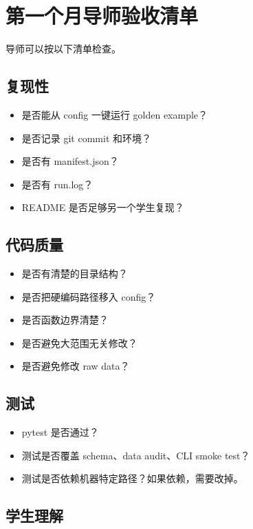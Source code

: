 \documentclass[11pt,a4paper,fontset=fandol]{ctexart}
\begin{document}
\section{第一个月导师验收清单}

导师可以按以下清单检查。

\subsection{复现性}

\begin{itemize}[leftmargin=2em]
  \item 是否能从 config 一键运行 golden example？
  \item 是否记录 git commit 和环境？
  \item 是否有 manifest.json？
  \item 是否有 run.log？
  \item README 是否足够另一个学生复现？
\end{itemize}

\subsection{代码质量}

\begin{itemize}[leftmargin=2em]
  \item 是否有清楚的目录结构？
  \item 是否把硬编码路径移入 config？
  \item 是否函数边界清楚？
  \item 是否避免大范围无关修改？
  \item 是否避免修改 raw data？
\end{itemize}

\subsection{测试}

\begin{itemize}[leftmargin=2em]
  \item pytest 是否通过？
  \item 测试是否覆盖 schema、data audit、CLI smoke test？
  \item 测试是否依赖机器特定路径？如果依赖，需要改掉。
\end{itemize}

\subsection{学生理解}
\end{document}
